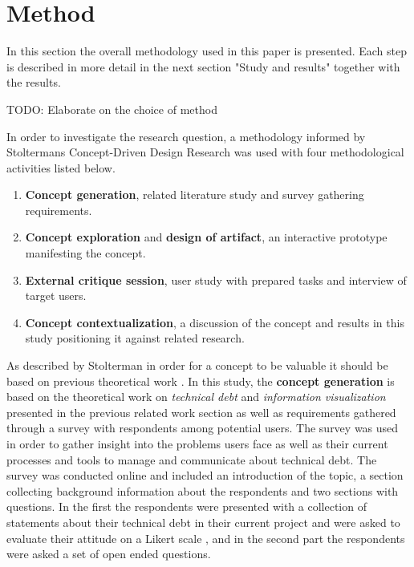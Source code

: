 

\section{Method}
In this section the overall methodology used in this paper is presented. Each step is described in more detail in the next section "Study and results" together with the results.

TODO: Elaborate on the choice of method

In order to investigate the research question, a methodology informed by Stoltermans Concept-Driven Design Research \cite{stolterman_concept-driven_2010} was used with four methodological activities listed below.

\smallskip
\begin{enumerate}
  \item \textbf{Concept generation}, related literature study and survey gathering requirements.
  \item \textbf{Concept exploration}  and \textbf{design of artifact}, an interactive prototype manifesting the concept.
  \item \textbf{External critique session}, user study with prepared tasks and interview of target users.
  \item \textbf{Concept contextualization}, a discussion of the concept and results in this study positioning it against related research.
\end{enumerate}
\smallskip

As described by Stolterman in order for a concept to be valuable it should be based on previous theoretical work \cite{stolterman_concept-driven_2010}.
In this study, the \textbf{concept generation} is based on the theoretical work on \textit{technical debt} and \textit{information visualization} presented in the previous related work section as well as requirements gathered through a survey with respondents among potential users.
The survey was used in order to gather insight into the problems users face as well as their current processes and tools to manage and communicate about technical debt. 
The survey was conducted online and included an introduction of the topic, a section collecting background information about the respondents and two sections with questions.
In the first the respondents were presented with a collection of statements about their technical debt in their current project and were asked to evaluate their attitude on a Likert scale \cite{wilson_questionnaires_2013}, and in the second part the respondents were asked a set of open ended questions.

